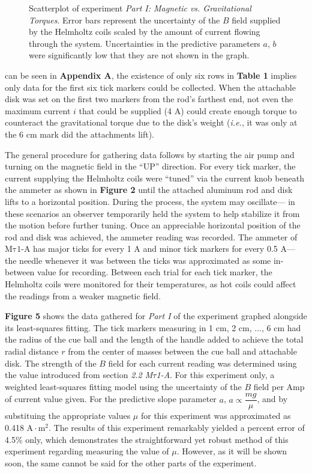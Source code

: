 \documentclass[12pt]{article}
\newcommand{\mtauonea}{\mathrm{M\tau1}\text{-}\mathrm{A}}
\begin{document}
\begin{multicols}{2}
\begin{figure}[H]
    \caption{
        Scatterplot of experiment \textit{Part I: Magnetic vs. Gravitational Torques}.
        Error bars represent the uncertainty of the $B$ field supplied by the Helmholtz coils
        scaled by the amount of current flowing through the system.
        Uncertainties in the predictive parameters $a$, $b$ were significantly low that they are
        not shown in the graph.
    }
\end{figure}
\noindent
can be seen in \textbf{Appendix A},
the existence of only six rows in \textbf{Table 1} implies only data for the first six tick markers
could be collected. When the attachable disk was set on the first two markers from the rod's farthest end,
not even the maximum current $i$ that could be supplied (4 A) could create enough torque to counteract the 
gravitational torque due to the disk's weight (\textit{i.e.}, it was only at the 6 cm mark did the attachments lift).

The general procedure for gathering data follows by starting the air pump and turning on the magnetic field in the ``UP'' direction.
For every tick marker, the current supplying the Helmholtz coils were ``tuned'' via the current knob beneath the ammeter as shown in \textbf{Figure 2}
until the attached aluminum rod and disk lifts to a horizontal position.
During the process, the system may oscillate--- in these scenarios an observer temporarily held the system to help stabilize it from the motion before further tuning.
Once an appreciable horizontal position of the rod and disk was achieved,
the ammeter reading was recorded.
The ammeter of $\mtauonea$ has major ticks for every 1 A and minor tick markers for every 0.5 A---
the needle whenever it was between the ticks was approximated as some in-between value for recording.
Between each trial for each tick marker, the Helmholtz coils were monitored for their temperatures,
as hot coils could affect the readings from a weaker magnetic field.

\textbf{Figure 5} shows the data gathered for \textit{Part I} of the experiment graphed alongside its least-squares fitting.
The tick markers measuring in 1 cm, 2 cm, $\ldots$, 6 cm had the radius of the cue ball and the
length of the handle added to achieve the total radial distance $r$ from the center of masses between the cue ball and attachable disk.
The strength of the $B$ field for each current reading was determined using the value introduced from section \textit{2.2 M$\tau$1-A}.
For this experiment only, a weighted least-squares fitting model using the uncertainty of the $B$ field per Amp of current value given.
For the predictive slope parameter $a$, $a\propto\dfrac{mg}{\mu}$, and by substituing the appropriate values
$\mu$ for this experiment was approximated as 0.418 $\mathrm{A\cdot m^2}$.
The results of this experiment remarkably yielded a percent error of 4.5\% only,
which demonstrates the straightforward yet robust method of this experiment regarding measuring the value of $\mu$.
However, as it will be shown soon, the same cannot be said for the other parts of the experiment.


\end{multicols}
\end{document}
